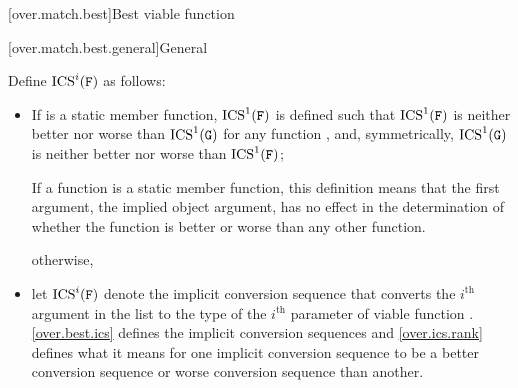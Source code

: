 [over.match.best]{Best viable function}%

[over.match.best.general]{General}%

\pnum
{}%
Define $\text{ICS}^i(\texttt{F})$ as follows:
\begin{itemize}
\item
If  is a static member function,
$\text{ICS}^1(\texttt{F})$ is defined such that
$\text{ICS}^1(\texttt{F})$ is neither better nor worse than
$\text{ICS}^1(\texttt{G})$ for any function ,
and, symmetrically, $\text{ICS}^1(\texttt{G})$ is neither better nor worse than
$\text{ICS}^1(\texttt{F})$;
\begin{footnote}
If a function is a static member function, this
definition means that the first argument, the implied object argument,
has no effect in the determination of whether the function is better
or worse than any other function.
\end{footnote}
otherwise,
\item
let $\text{ICS}^i(\texttt{F})$ denote the implicit conversion sequence that converts
the $i^\text{th}$ argument in the list to the type of
the $i^\text{th}$ parameter of viable function .
\ref{over.best.ics} defines the implicit conversion sequences and \ref{over.ics.rank}
defines what it means for one implicit conversion sequence to be
a better conversion sequence or worse conversion sequence than
another.
\end{itemize}

